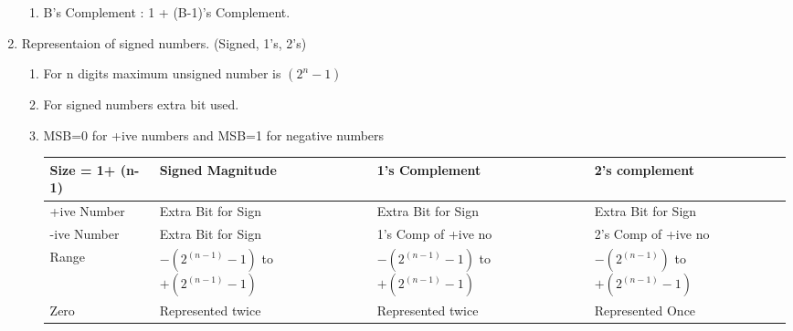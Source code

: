 \begin{enumerate}
\begin{minipage}{\linewidth}
\begin{enumerate}
        \item B's Complement : 1 + (B-1)'s Complement. \\
    \end{enumerate}
    \end{minipage}


    \item Representaion of signed numbers. (Signed, 1's, 2's)
    \begin{enumerate}
        \item For n digits maximum unsigned number is \( (2^n -1) \)
        \item For signed numbers extra bit used.
        \item MSB=0 for +ive numbers and MSB=1 for negative numbers \\
    \begin{myTableStyle} \begin{tabular}{ |m{3cm}|m{3cm}|m{3cm}|m{3cm}| } \hline
        Size = 1+ (n-1)     & Signed Magnitude           & 1's Complement       & 2's complement        \\ \hline
        +ive Number         & Extra Bit for Sign         & Extra Bit for Sign   & Extra Bit for Sign    \\ \hline
        -ive Number         & Extra Bit for Sign         & 1's Comp of +ive no  & 2's Comp of +ive no   \\ \hline
        Range               & \makecell[l]{ \( -(2^{(n-1)} -1) \) to \\ \( +(2^{(n-1)} -1) \) }
                                                         & \makecell[l]{ \( -(2^{(n-1)} -1) \) to \\ \( +(2^{(n-1)} -1) \) }
                                                         & \makecell[l]{ \( -(2^{(n-1)}) \) to \\ \( +(2^{(n-1)} -1) \) }   \\ \hline
        Zero                & Represented twice          & Represented twice    & Represented Once   \\ \hline
    \end{tabular} \end{myTableStyle} \vspace{0.08in}
    \end{enumerate}


\end{enumerate}
